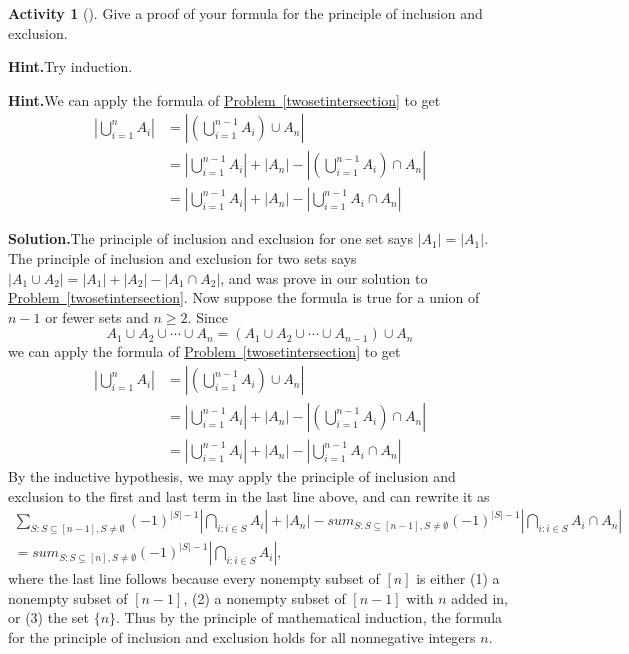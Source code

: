 \documentclass[10pt,]{book}
\theoremstyle{plain}
\theoremstyle{definition}
\newtheorem{activity}[project]{Activity}
\numberwithin{equation}{chapter}
\newcommand{\amp}{&}
\begin{document}
\begin{activity}[]\label{activity-228}
Give a proof of your formula for the principle of inclusion and exclusion.%
\par\medskip\noindent%
\textbf{Hint.}\quad Try induction.%
\par\medskip\noindent%
\textbf{Hint.}\quad We can apply the formula of \hyperref[twosetintersection]{Problem~\ref{twosetintersection}} to get%
\begin{align*}
\left|\bigcup_{i=1}^n A_i \right| \amp = \left|\left(\bigcup_{i=1}^{n-1} A_i\right) \cup A_n \right| \\
\amp = \left| \bigcup_{i=1}^{n-1} A_i\right| + |A_n| - \left|\left( \bigcup_{i=1}^{n-1} A_i\right) \cap A_n\right|\\
\amp = \left| \bigcup_{i=1}^{n-1} A_i\right| + |A_n| - \left|\bigcup_{i=1}^{n-1} A_i \cap A_n\right|
\end{align*}
%
\par\medskip\noindent%
\textbf{Solution.}\quad The principle of inclusion and exclusion for one set says \(|A_1| = |A_1|\).  The principle of inclusion and exclusion for two sets says \(|A_1\cup A_2| = |A_1| + |A_2| - |A_1 \cap A_2|\), and was prove in our solution to \hyperref[twosetintersection]{Problem~\ref{twosetintersection}}.  Now suppose the formula is true for a union of \(n-1\) or fewer sets and \(n \ge 2\).  Since%
\begin{equation*}
A_1 \cup A_2 \cup \cdots \cup A_n = \left(A_1 \cup A_2 \cup \cdots \cup A_{n-1}\right) \cup A_n
\end{equation*}
we can apply the formula of \hyperref[twosetintersection]{Problem~\ref{twosetintersection}} to get%
\begin{align*}
\left|\bigcup_{i=1}^n A_i \right| \amp = \left|\left(\bigcup_{i=1}^{n-1} A_i\right) \cup A_n \right| \\
\amp = \left| \bigcup_{i=1}^{n-1} A_i\right| + |A_n| - \left|\left( \bigcup_{i=1}^{n-1} A_i\right) \cap A_n\right|\\
\amp = \left| \bigcup_{i=1}^{n-1} A_i\right| + |A_n| - \left|\bigcup_{i=1}^{n-1} A_i \cap A_n\right|
\end{align*}
By the inductive hypothesis, we may apply the principle of inclusion and exclusion to the first and last term in the last line above, and can rewrite it as%
\begin{gather*}
\sum_{S:S\subseteq [n-1],S\ne \emptyset} (-1)^{|S|-1}\left|\bigcap_{i:i\in S}A_i \right| + |A_n| - sum_{S:S\subseteq [n-1],S\ne \emptyset} (-1)^{|S|-1}\left|\bigcap_{i:i\in S}A_i \cap A_n \right|
\\
= sum_{S:S\subseteq [n],S\ne \emptyset} (-1)^{|S|-1}\left|\bigcap_{i:i\in S}A_i \right|,
\end{gather*}
where the last line follows because every nonempty subset of \([n]\) is either (1) a nonempty subset of \([n-1]\), (2) a nonempty subset of \([n-1]\) with  \(n\) added in, or (3) the set \(\{n\}\).  Thus by the principle of mathematical induction, the formula for the principle of inclusion and exclusion holds for all nonnegative integers \(n\).%
\end{activity}
\end{document}
